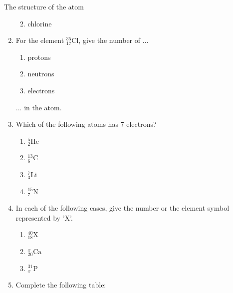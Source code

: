 \begin{exercises}{The structure of the atom}
\begin{enumerate}[noitemsep, label=\textbf{\arabic*}. ]
\begin{enumerate}[noitemsep, label=\textbf{\alph*}. ]
\label{m38745*uid23}\item chlorine
\end{enumerate}
                \label{m38745*uid24}\item 
For the element $_{17}^{35}\text{Cl}$, give the number of ...
\label{m38745*id256843}\begin{enumerate}[noitemsep, label=\textbf{\alph*}. ] 
            \label{m38745*uid25}\item protons
\label{m38745*uid26}\item neutrons
\label{m38745*uid27}\item electrons
\end{enumerate}
... in the atom.\newline
\label{m38745*uid28}\item Which of the following atoms has 7 electrons?
\label{m38745*id256898}\begin{enumerate}[noitemsep, label=\textbf{\alph*}. ] 
            \label{m38745*uid29}\item $_{2}^{5}\text{He}$
\label{m38745*uid30}\item $_{6}^{13}\text{C}$
\label{m38745*uid31}\item $_{3}^{7}\text{Li}$
\label{m38745*uid32}\item $_{7}^{15}\text{N}$
\end{enumerate}
                \label{m38745*uid33}\item 
In each of the following cases, give the number or the element symbol represented by 'X'.
\label{m38745*id257023}\begin{enumerate}[noitemsep, label=\textbf{\alph*}. ] 
            \label{m38745*uid34}\item $_{18}^{40}\text{X}$
\label{m38745*uid35}\item $_{20}^{x}\text{Ca}$
\label{m38745*uid36}\item $_{x}^{31}\text{P}$
\end{enumerate}
                \label{m38745*uid37}\item 
Complete the following table:
          \begin{table}[H]
        \begin{center}
      \label{m38745*id257121}
    \noindent
      \begin{tabular}{|l|l|l|l|}\hline

\end{tabular}
\end{center}
\end{table}
\end{enumerate}
\end{exercises}
